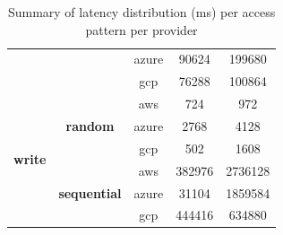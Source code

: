 \documentclass[11pt]{article}
\begin{document}
\begin{table}[h]
\begin{tabular}{|c|c|c|c|c|}
                                &                                                                                     & azure             & 90624           & 199680       \\ \cline{3-5} 
                                &                                                                                     & gcp               & 76288           & 100864       \\ \hline
\multirow{6}{*}{\textbf{write}} & \multirow{3}{*}{\textbf{random}}                                                    & aws               & 724             & 972          \\ \cline{3-5} 
                                &                                                                                     & azure             & 2768            & 4128         \\ \cline{3-5} 
                                &                                                                                     & gcp               & 502             & 1608         \\ \cline{2-5} 
                                & \multirow{3}{*}{\textbf{sequential}}                                                & aws               & 382976          & 2736128      \\ \cline{3-5} 
                                &                                                                                     & azure             & 31104           & 1859584      \\ \cline{3-5} 
                                &                                                                                     & gcp               & 444416          & 634880       \\ \hline
\end{tabular}
\caption{Summary of latency distribution (ms) per access pattern per provider}
\label{tab:bench_fio}
\end{table}

\pagebreak
\printbibliography
\end{document}
